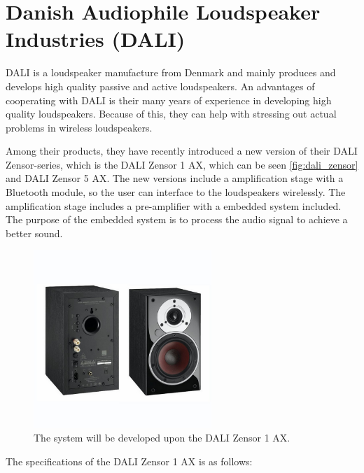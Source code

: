\section{Danish Audiophile Loudspeaker Industries (DALI)} \label{app:dali}
DALI is a loudspeaker manufacture from Denmark and mainly produces and develops high quality passive and active loudspeakers. An advantages of cooperating with DALI is their many years of experience in developing high quality loudspeakers. Because of this, they can help with stressing out actual problems in wireless loudspeakers.

Among their products, they have recently introduced a new version of their DALI Zensor-series, which is the DALI Zensor 1 AX, which can be seen \autoref{fig:dali_zensor} and DALI Zensor 5 AX. The  new versions include a amplification stage with a Bluetooth module, so the user can interface to the loudspeakers wirelessly. The amplification stage includes a pre-amplifier with a embedded system included. The purpose of the embedded system is to process the audio signal to achieve a better sound.

\begin{figure}[H]
\centering
\includegraphics[width=0.6\textwidth]{figures/dali_zensor_1_ax.jpg}
\caption{The system will be developed upon the DALI Zensor 1 AX.}
\label{fig:dali_zensor}
\end{figure}

The specifications of the DALI Zensor 1 AX is as follows:

